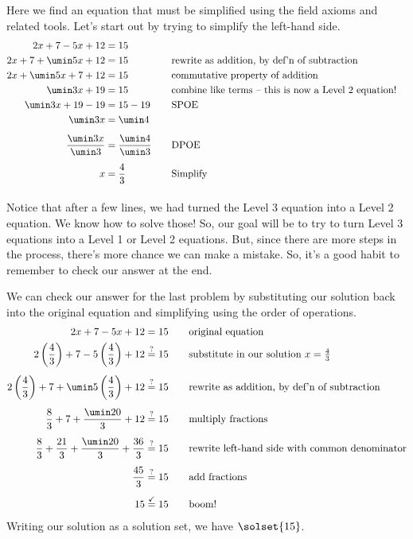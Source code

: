 Here we find an equation that must be simplified using the field axioms and related tools. Let's start out by trying to simplify the left-hand side.
\[\begin{aligned}
2x + 7 - 5x + 12 & = 15\\
2x + 7 + \umin5x + 12 & = 15
&&\text{\quad rewrite as addition, by def'n of subtraction}\\
2x + \umin5x + 7 + 12 & = 15
&&\text{\quad commutative property of addition}\\
\umin3x + 19 & = 15
&&\text{\quad combine like terms -- this is now a Level 2 equation!}\\
\umin3x + 19 - 19 & = 15 - 19
&&\text{\quad SPOE}\\
\umin3x & = \umin4
&&\text{}\\[1ex]
\frac{\umin3x}{\umin3} & = \frac{\umin4}{\umin3}
&&\text{\quad DPOE}\\[1ex]
x & = \frac{4}{3}
&&\text{\quad Simplify}\\[1ex]
\end{aligned}\]

Notice that after a few lines, we had turned the Level 3 equation into a Level 2 equation. We know how to solve those! So, our goal will be to try to turn Level 3 equations into a Level 1 or Level 2 equations. But, since there are more steps in the process, there's more chance we can make a mistake. So, it's a good habit to remember to check our answer at the end.

We can check our answer for the last problem by substituting our solution back into the original equation and simplifying using the order of operations.
\[\begin{aligned}
2x + 7 - 5x + 12 & = 15
&& \text{\quad original equation}\\
2\left(\frac{4}{3}\right) + 7 - 5\left(\frac{4}{3}\right) + 12 & \overset{?}{=} 15
&& \text{\quad substitute in our solution $x = \tfrac{4}{3}$}\\[1ex]
2\left(\frac{4}{3}\right) + 7 + \umin5\left(\frac{4}{3}\right) + 12 & \overset{?}{=} 15
&& \text{\quad rewrite as addition, by def'n of subtraction}\\[1ex]
\frac{8}{3} + 7 + \frac{\umin20}{3} + 12 & \overset{?}{=} 15
&& \text{\quad multiply fractions}\\[1ex]
\frac{8}{3} + \frac{21}{3} + \frac{\umin20}{3} + \frac{36}{3} & \overset{?}{=} 15
&& \text{\quad rewrite left-hand side with common denominator}\\[1ex]
\frac{45}{3} & \overset{?}{=} 15
&& \text{\quad add fractions}\\[1ex]
15 & \overset{\checkmark}{=} 15
&& \text{\quad boom!}
\end{aligned}\]
Writing our solution as a solution set, we have $\solset{15}$.

